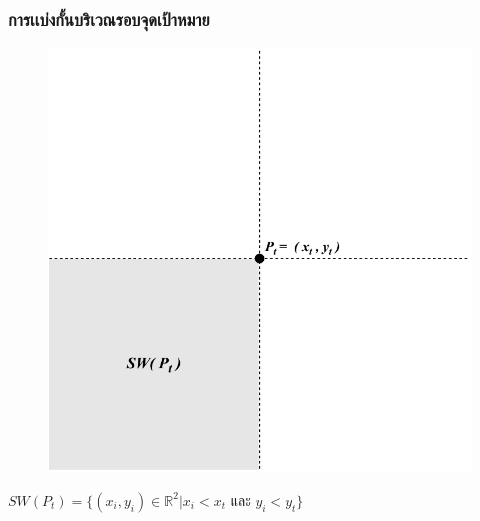 \documentclass[12pt,aspectratio=169]{beamer}
\begin{document}
\begin{frame}
\frametitle{การเเบ่งกั้นบริเวณรอบจุดเป้าหมาย}
\begin{center}
                \begin{figure}
                    \includegraphics[scale=0.5]{img/SWP_t.pdf}
                \end{figure}
                $SW(P_t) = \{(x_{i} , y_{i}) \in \mathbb{R}^2 | x_{i} < x_{t} \text{ และ } y_{i} < y_{t}\} $
            \end{center}
\end{frame}
\end{document}
